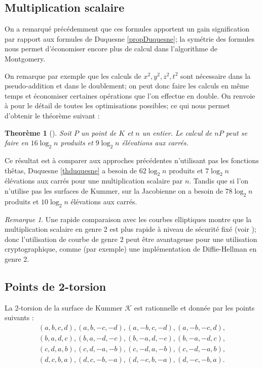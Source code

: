 \documentclass[a4paper]{article}
\newtheorem{theoreme}{Theorème}[section]
\theoremstyle{definition}
\theoremstyle{remark}
\newtheorem{remarque}{Remarque}
\numberwithin{equation}{section}
\begin{document}
\subsection{Multiplication scalaire}

On a remarqué précédemment que ces formules apportent un gain signification par rapport aux formules de Duquesne \ref{propDuquesne}; la symétrie des formules nous permet d'économiser encore plus de calcul dans l'algorithme de Montgomery.

On remarque par exemple que les calculs de $x^2,y^2,z^2,t^2$ sont nécessaire dans la pseudo-addition et dans le doublement; on peut donc faire les calculs en même temps et économiser certaines opérations que l'on effectue en double. On renvoie à \citep{gaudry} pour le détail de toutes les optimisations possibles; ce qui nous permet d'obtenir le théorème suivant :
\begin{theoreme}[\citet{gaudry}]
Soit $P$ un point de $K$ et $n$ un entier. Le calcul de $nP$ peut se faire en $16\log_2 n$ produits et $9\log_2 n$ élévations aux carrés.
\end{theoreme}

Ce résultat est à comparer aux approches précédentes n'utilisant pas les fonctions thêtas, Duquesne \ref{thduquesne} a besoin de $62\log_2 n$ produits et $7\log_2 n$ élévations aux carrés pour une multiplication scalaire par $n$. Tandis que si l'on n'utilise pas les surfaces de Kummer, sur la Jacobienne on a besoin de $78\log_2 n$ produits et $10\log_2 n$ élévations aux carrés.

\begin{remarque}
Une rapide comparaison avec les courbes elliptiques montre que la multiplication scalaire en genre 2 est plus rapide à niveau de sécurité fixé (voir \citet[5.5]{gaudry}); donc l'utilisation de courbe de genre 2 peut être avantageuse pour une utilisation cryptographique, comme (par exemple) une implémentation de Diffie-Hellman en genre 2.
\end{remarque}

\subsection{Points de 2-torsion}

La 2-torsion de la surface de Kummer $\mathcal{K}$ est rationnelle et donnée par les points suivants :
\begin{align*}
   &(a,b,c,d),(a,b,-c,-d),(a,-b,c,-d),(a,-b,-c,d),& \\
   &(b,a,d,c),(b,a,-d,-c),(b,-a,d,-c),(b,-a,-d,c),& \\
   &(c,d,a,b),(c,d,-a,-b),(c,-d,a,-b),(c,-d,-a,b),& \\
   &(d,c,b,a),(d,c,-b,-a),(d,-c,b,-a),(d,-c,-b,a).&
\end{align*}
\end{document}
